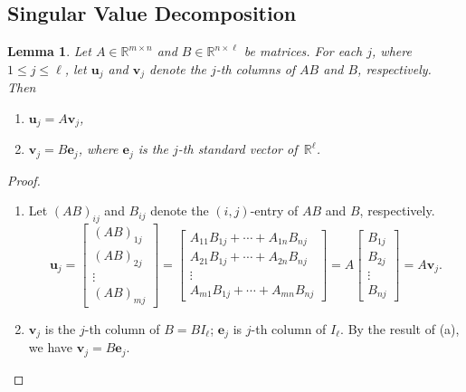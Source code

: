\documentclass[12pt]{article}
\newtheorem{lemma}[theorem]{Lemma}
\theoremstyle{definition}
\begin{document}
\subsection{Singular Value Decomposition}
\begin{lemma} \label{lem:svd}
    Let $A\in\mathbb{R}^{m\times n}$ and $B\in\mathbb{R}^{n\times\ell}$ be matrices. For each $j$, where $1\leq j\leq \ell$, let $\mathbf{u}_j$ and $\mathbf{v}_j$ denote the $j$-th columns of $AB$ and $B$, respectively. Then
    \begin{enumerate}
        \item[\textnormal{(a)}] 
        $\mathbf{u}_j=A\mathbf{v}_j$,
        \item[\textnormal{(b)}] 
        $\mathbf{v}_j=B\mathbf{e}_j$, where $\mathbf{e}_j$ is the $j$-th standard vector of \,$\mathbb{R}^\ell$.
    \end{enumerate}
\end{lemma}
\begin{proof}
    \begin{enumerate}
        \item[(a)]
        Let $(AB)_{ij}$ and $B_{ij}$ denote the $(i,j)$-entry of $AB$ and $B$, respectively.
            \[ \mathbf{u}_j =
            \begin{bmatrix}
                (AB)_{1j} \\
                (AB)_{2j} \\
                \vdots \\
                (AB)_{mj}
            \end{bmatrix}
            =
            \begin{bmatrix}
                A_{11}B_{1j} + \cdots + A_{1n}B_{nj} \\
                A_{21}B_{1j} + \cdots + A_{2n}B_{nj} \\
                \vdots \\
                A_{m1}B_{1j} + \cdots + A_{mn}B_{nj}
            \end{bmatrix}
            = A
            \begin{bmatrix}
                B_{1j} \\
                B_{2j} \\
                \vdots \\
                B_{nj}
            \end{bmatrix}
            = A\mathbf{v}_j.
            \]
        \item[(b)]
        $\mathbf{v}_j$ is the $j$-th column of $B = BI_\ell$; $\mathbf{e}_j$ is $j$-th column of $I_\ell$. By the result of (a), we have $\mathbf{v}_j = B\mathbf{e}_j$.
    \end{enumerate}
\end{proof}
\end{document}
